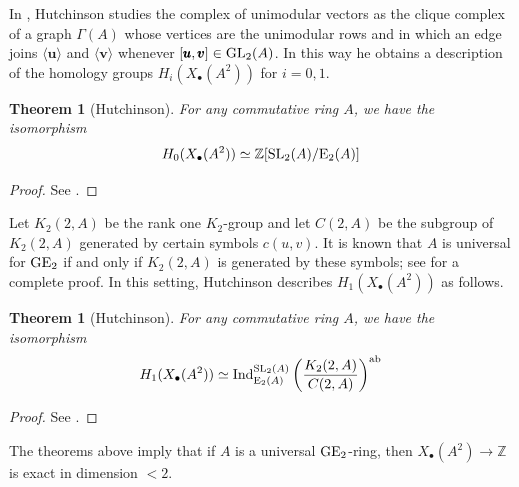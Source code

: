 \documentclass[11pt]{amsart}
\theoremstyle{definition}
\theoremstyle{plain}
\newtheorem{prp}[ntn]{Proposition}
\newtheorem{thm}[ntn]{Theorem}
\numberwithin{equation}{section}
\newcommand{\z}{\mathbb{Z}}
\newcommand{\lan}{\langle}
\newcommand{\ran}{\rangle}
\newcommand{\GE}{{\rm GE}}
\newcommand{\Ee}{\mathrm{E}}
\newcommand{\Ind}{{\rm Ind}}
\newcommand{\GL}{\mathit{{\rm GL}}}
\newcommand{\SL}{\mathit{{\rm SL}}}
\begin{document}
In \cite{hutchinson2022}, Hutchinson studies the complex of unimodular vectors as the clique complex of a graph $\Gamma(A)$ whose vertices are the unimodular rows and in which an edge joins $\lan\pmb{u}\ran$ and $\lan\pmb{v}\ran$ whenever $[\pmb{u},\pmb{v}]\in \GL_2(A)$. In this way he obtains a description of the homology groups $H_i(X_\bullet(A^2))$ for $i=0,1$. 
\begin{thm}[Hutchinson]
    For any commutative ring $A$, we have the isomorphism
    \[
        H_0(X_\bullet(A^2))\simeq\z[\SL_2(A)/\Ee_2(A)]
    \]
\end{thm}
\begin{proof}
    See \cite[Theorem 2.3]{B-E--2026}.
\end{proof}
Let $K_2(2,A)$ be the rank one $K_2$-group and let $C(2,A)$ be the subgroup of $K_2(2,A)$ generated by certain symbols $c(u,v)$. It is known that $A$ is universal for $\GE_2$ if and only if $K_2(2,A)$ is generated by these symbols; see \cite[Appendix A]{hutchinson2022} for a complete proof. In this setting, Hutchinson describes $H_1(X_\bullet(A^2))$ as follows.
\begin{thm}[Hutchinson]
    For any commutative ring $A$, we have the isomorphism
    \[
        H_1(X_\bullet(A^2))\simeq \Ind^{\SL_2(A)}_{\Ee_2(A)}\left(\frac{K_2(2,A)}{C(2,A)}\right)^{\textrm{ab}}
    \]
\end{thm}
\begin{proof}
    See \cite[Theorem 2.5]{B-E--2026}.
\end{proof}
The theorems above imply that if $A$ is a universal $\GE_2$-ring, then $X_\bullet(A^2)\to\z$ is exact in dimension $<2$.
\end{document}
